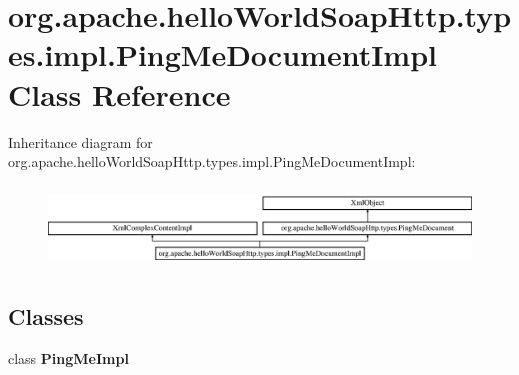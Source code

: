 \hypertarget{classorg_1_1apache_1_1hello_world_soap_http_1_1types_1_1impl_1_1_ping_me_document_impl}{}\section{org.\+apache.\+hello\+World\+Soap\+Http.\+types.\+impl.\+Ping\+Me\+Document\+Impl Class Reference}
\label{classorg_1_1apache_1_1hello_world_soap_http_1_1types_1_1impl_1_1_ping_me_document_impl}
Inheritance diagram for org.\+apache.\+hello\+World\+Soap\+Http.\+types.\+impl.\+Ping\+Me\+Document\+Impl\+:\begin{figure}[H]
\begin{center}
\leavevmode
\includegraphics[height=2.181818cm]{classorg_1_1apache_1_1hello_world_soap_http_1_1types_1_1impl_1_1_ping_me_document_impl}
\end{center}
\end{figure}
\subsection*{Classes}
\begin{DoxyCompactItemize}
\item 
class {\bfseries Ping\+Me\+Impl}
\end{DoxyCompactItemize}

